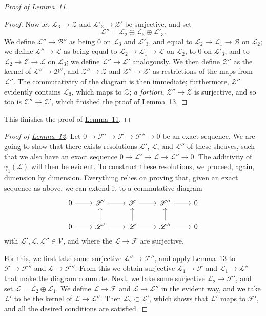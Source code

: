 \documentclass{article}
\theoremstyle{plain}
\theoremstyle{definition}
\newcommand{\scr}[1]{{\mathscr{#1}}}
\renewcommand{\cal}[1]{{\mathcal{#1}}}
\begin{document}
\begin{proof}[Proof of {\hyperref[lemma11]{Lemma~11}}]
\begin{proof}
    Now let $\scr{L}_3\to\scr{Z}$ and $\scr{L}'_3\to\scr{Z}'$ be surjective, and set
    \[
      \scr{L}'' = \scr{L}_2\oplus\scr{L}_3\oplus\scr{L}'_3.
    \]
    We define $\scr{L}''\to\scr{B}''$ as being $0$ on $\scr{L}_3$ and $\scr{L}'_3$, and equal to $\scr{L}_2\to\scr{L}_1\to\scr{B}$ on $\scr{L}_2$;
    we define $\scr{L}''\to\scr{L}$ as being equal to $\scr{L}_2\to\scr{L}_1\to\scr{L}$ on $\scr{L}_2$, to $0$ on $\scr{L}'_3$, and to $\scr{L}_2\to\scr{Z}\to\scr{L}$ on $\scr{L}_3$;
    we define $\scr{L}''\to\scr{L}'$ analogously.
    We then define $\scr{Z}''$ as the kernel of $\scr{L}''\to\scr{B}''$, and $\scr{Z}''\to\scr{Z}$ and $\scr{Z}''\to\scr{Z}'$ as restrictions of the maps from $\scr{L}''$.
    The commutativity of the diagram is then immediate;
    furthermore, $\scr{Z}''$ evidently contains $\scr{L}_3$, which maps to $\scr{Z}$;
    \emph{a fortiori}, $\scr{Z}''\to\scr{Z}$ is surjective, and so too is $\scr{Z}''\to\scr{Z}'$, which finished the proof of \hyperref[lemma13]{Lemma~13}.
  \end{proof}
  This finishes the proof of \hyperref[lemma11]{Lemma~11}.
\end{proof}

\begin{proof}[Proof of {\hyperref[lemma12]{Lemma~12}}]
  Let $0\to\scr{F}'\to\scr{F}\to\scr{F}''\to0$ be an exact sequence.
  We are going to show that there exists resolutions $\scr{L}'$, $\scr{L}$, and $\scr{L}''$ of these sheaves, such that we also have an exact sequence $0\to\scr{L}'\to\scr{L}\to\scr{L}''\to0$.
  The additivity of $\gamma_1(\scr{L})$ will then be evident.
  To construct these resolutions, we proceed, again, dimension by dimension.
  Everything relies on proving that, given an exact sequence as above, we can extend it to a commutative diagram
  \[
    \begin{tikzcd}
      0 \rar
      & \scr{F}' \rar
      & \scr{F} \rar
      & \scr{F}'' \rar
      & 0
    \\0 \rar
      & \scr{L}' \rar\uar
      & \scr{L} \rar\uar
      & \scr{L}'' \rar\uar
      & 0
    \end{tikzcd}
  \]
  with $\scr{L}',\scr{L},\scr{L}''\in\cal{V}$, and where the $\scr{L}\to\scr{F}$ are surjective.

  For this, we first take some surjective $\scr{L}''\to\scr{F}''$, and apply \hyperref[lemma13]{Lemma~13} to $\scr{F}\to\scr{F}''$ and $\scr{L}\to\scr{F}''$.
  From this we obtain surjective $\scr{L}_1\to\scr{F}$ and $\scr{L}_1\to\scr{L}''$ that make the diagram commute.
  Next, we take some surjective $\scr{L}_2\to\scr{F}'$, and set $\scr{L}=\scr{L}_2\oplus\scr{L}_1$.
  We define $\scr{L}\to\scr{F}$ and $\scr{L}\to\scr{L}''$ in the evident way, and we take $\scr{L}'$ to be the kernel of $\scr{L}\to\scr{L}''$.
  Then $\scr{L}_2\subset\scr{L}'$, which shows that $\scr{L}'$ maps to $\scr{F}'$, and all the desired conditions are satisfied.
\end{proof}
\end{document}

